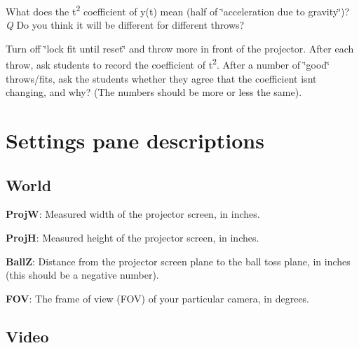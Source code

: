 \begin{DoxyEnumerate}
What does the t\textsuperscript{2} coefficient of y(t) mean (half of \char`\"{}acceleration
   due to gravity\char`\"{})? {\itshape Q} Do you think it will be different for different throws?
\item Turn off \char`\"{}lock fit until reset\char`\"{} and throw more in front of the projector. After each throw, ask students to record the coefficient of t\textsuperscript{2}. After a number of \char`\"{}good\char`\"{} throws/fits, ask the students whether they agree that the coefficient isn\textquotesingle{}t changing, and why? (The numbers should be more or less the same).
\end{DoxyEnumerate}

\section*{Settings pane descriptions}

\subsection*{World}


\begin{DoxyItemize}
\item {\bfseries ProjW}\+: Measured width of the projector screen, in inches.
\item {\bfseries ProjH}\+: Measured height of the projector screen, in inches.
\item {\bfseries BallZ}\+: Distance from the projector screen plane to the ball toss plane, in inches (this should be a negative number).
\item {\bfseries F\+OV}\+: The frame of view (F\+OV) of your particular camera, in degrees.
\end{DoxyItemize}

\subsection*{Video}


